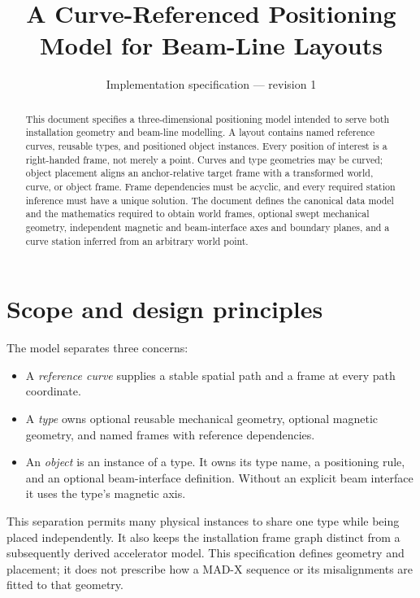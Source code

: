 \documentclass[11pt,a4paper]{article}
\title{A Curve-Referenced Positioning Model for Beam-Line Layouts}
\author{}
\date{Implementation specification --- revision 1}
\begin{document}
\maketitle

\begin{abstract}
This document specifies a three-dimensional positioning model intended to serve
both installation geometry and beam-line modelling.  A layout contains named
reference curves, reusable types, and positioned object instances.  Every
position of interest is a right-handed frame, not merely a point.  Curves and
type geometries may be curved; object placement aligns an anchor-relative target
frame with a transformed world, curve, or object frame. Frame dependencies must
be acyclic, and every required station inference must have a unique solution.
The document defines the canonical data model and the mathematics required to
obtain world frames, optional swept mechanical geometry, independent magnetic
and beam-interface axes and boundary planes, and a curve station inferred from
an arbitrary world point.
\end{abstract}

\tableofcontents

\section{Scope and design principles}

The model separates three concerns:

\begin{itemize}
  \item A \emph{reference curve} supplies a stable spatial path and a frame at
        every path coordinate.
  \item A \emph{type} owns optional reusable mechanical geometry, optional
        magnetic geometry, and named frames with reference dependencies.
  \item An \emph{object} is an instance of a type.  It owns its type name,
        a positioning rule, and an optional beam-interface definition.
        Without an explicit beam interface it uses the type's magnetic axis.
\end{itemize}

This separation permits many physical instances to share one type while being
placed independently.  It also keeps the installation frame graph distinct
from a subsequently derived accelerator model.  This specification defines
geometry and placement; it does not prescribe how a MAD-X sequence or its
misalignments are fitted to that geometry.
\end{document}
